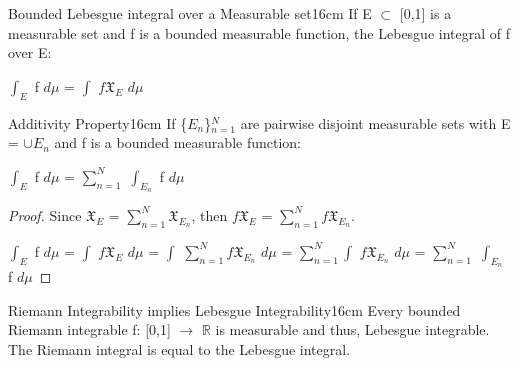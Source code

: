     \vspace{0.5cm}



    \begin{definition}{Bounded Lebesgue integral over a Measurable set}{16cm}
        If E $\subset$ [0,1] is a measurable set and f is a bounded measurable
        function, the {\color{lblue} Lebesgue integral of f over E}:

        \hspace{0.5cm}
        $\int_E$ f $d\mu$ = $\int$ $f \mathfrak{X}_E$ $d\mu$
    \end{definition}

    \newpage



    \begin{wtheorem}{Additivity Property}{16cm}
        If \{$E_n$\}$_{n=1}^N$ are pairwise disjoint measurable sets
        with E = $\cup E_n$ and f is a bounded measurable function:

        \hspace{0.5cm}
        $\int_E$ f $d\mu$ = $\sum_{n=1}^N$ $\int_{E_n}$ f $d\mu$
    \end{wtheorem}

    \begin{proof}
        Since $\mathfrak{X}_E$ = $\sum_{n=1}^N \mathfrak{X}_{E_n}$,
        then $f\mathfrak{X}_E$ = $\sum_{n=1}^N f\mathfrak{X}_{E_n}$.

        \hspace{0.5cm}
        $\int_E$ f $d\mu$
        = $\int$ $f \mathfrak{X}_E$ $d\mu$
        = $\int$ $\sum_{n=1}^N f\mathfrak{X}_{E_n}$ $d\mu$
        = $\sum_{n=1}^N \int$ $f\mathfrak{X}_{E_n}$ $d\mu$
        = $\sum_{n=1}^N$ $\int_{E_n}$ f $d\mu$
    \end{proof}

    \vspace{0.5cm}



    \begin{wtheorem}{Riemann Integrability implies Lebesgue Integrability}{16cm}
        Every bounded Riemann integrable f: [0,1] $\rightarrow$ $\mathbb{R}$
        is measurable and thus, Lebesgue integrable.
        The Riemann integral is equal to the Lebesgue integral.
    \end{wtheorem}

